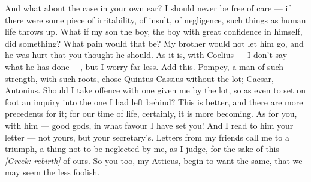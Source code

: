  And what about the case in your own ear? I should never be free of care --- if there were some piece of irritability, of insult, of negligence, such things as human life throws up. What if my son the boy, the boy with great confidence in himself, did something? What pain would that be? My brother would not let him go, and he was hurt that you thought he should. As it is, with Coelius --- I don't say what he has done ---, but I worry far less. Add this. Pompey, a man of such strength, with such roots, chose Quintus Cassius without the lot; Caesar, Antonius. Should I take offence with one given me by the lot, so as even to set on foot an inquiry into the one I had left behind? This is better, and there are more precedents for it; for our time of life, certainly, it is more becoming. As for you, with him --- good gods, in what favour I have set you! And I read to him your letter --- not yours, but your secretary's. Letters from my friends call me to a triumph, a thing not to be neglected by me, as I judge, for the sake of this \textit{[Greek: rebirth]} of ours. So you too, my Atticus, begin to want the same, that we may seem the less foolish.
